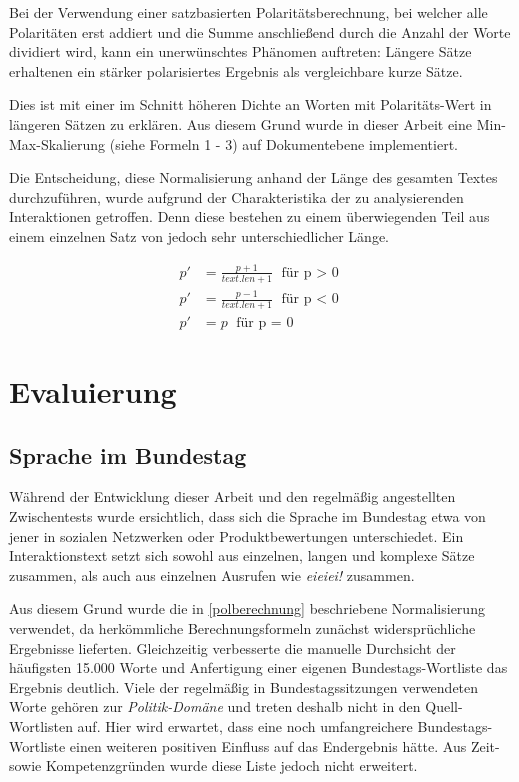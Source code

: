 Bei der Verwendung einer satzbasierten Polaritätsberechnung, bei welcher alle Polaritäten erst addiert und die Summe anschließend durch die Anzahl der Worte dividiert wird, kann ein unerwünschtes Phänomen auftreten: 
Längere Sätze erhaltenen ein stärker polarisiertes Ergebnis als vergleichbare kurze Sätze. 

Dies ist mit einer im Schnitt höheren Dichte an Worten mit Polaritäts-Wert in längeren Sätzen zu erklären. 
Aus diesem Grund wurde in dieser Arbeit eine Min-Max-Skalierung (siehe Formeln 1 - 3) auf Dokumentebene implementiert. 

Die Entscheidung, diese Normalisierung anhand der Länge des gesamten Textes durchzuführen, wurde aufgrund der Charakteristika der zu analysierenden Interaktionen getroffen. 
Denn diese bestehen zu einem überwiegenden Teil aus einem einzelnen Satz von jedoch sehr unterschiedlicher Länge. 

\begin{align}
p' &= \frac{ p + 1 }{ text.len + 1 } \text{ für p $>$ 0}\\
p' &= \frac{ p - 1 }{ text.len + 1 } \text{ für p $<$ 0}\\
p' &= p \text{ für p $=$ 0}
\end{align}

\section{Evaluierung}
\subsection{Sprache im Bundestag}
\label{sprachebundestag}
Während der Entwicklung dieser Arbeit und den regelmäßig angestellten Zwischentests wurde ersichtlich, dass sich die Sprache im Bundestag etwa von jener in sozialen Netzwerken oder Produktbewertungen unterschiedet. 
Ein Interaktionstext setzt sich sowohl aus einzelnen, langen und komplexe Sätze zusammen, als auch aus einzelnen Ausrufen wie \textit{\glqq eieiei!\grqq} zusammen. 

Aus diesem Grund wurde die in \ref{polberechnung} beschriebene Normalisierung verwendet, da herkömmliche Berechnungsformeln zunächst widersprüchliche Ergebnisse lieferten. 
Gleichzeitig verbesserte die manuelle Durchsicht der häufigsten 15.000 Worte und Anfertigung einer eigenen Bundestags-Wortliste das Ergebnis deutlich. 
Viele der regelmäßig in Bundestagssitzungen verwendeten Worte gehören zur \textit{Politik-Domäne} und treten deshalb nicht in den Quell-Wortlisten auf. 
Hier wird erwartet, dass eine noch umfangreichere Bundestags-Wortliste einen weiteren positiven Einfluss auf das Endergebnis hätte. 
Aus Zeit- sowie Kompetenzgründen wurde diese Liste jedoch nicht erweitert. 


